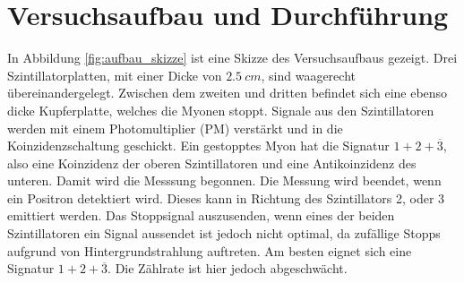 \documentclass[a4paper,ngerman]{scrartcl}
\begin{document}
\clearpage

\section{Versuchsaufbau und Durchführung}

In Abbildung \ref{fig:aufbau_skizze} ist eine Skizze des Versuchsaufbaus gezeigt. Drei Szintillatorplatten, mit einer Dicke von $\SI{2.5}{cm}$, sind waagerecht übereinandergelegt. Zwischen dem zweiten und dritten befindet sich eine ebenso dicke Kupferplatte, welches die Myonen stoppt. 
Signale aus den Szintillatoren werden mit einem Photomultiplier (PM) verstärkt und in die Koinzidenzschaltung geschickt.
Ein gestopptes Myon hat die Signatur $1 + 2 + \overline{3}$, also eine Koinzidenz der oberen Szintillatoren und eine Antikoinzidenz des unteren. Damit wird die Messsung begonnen. Die Messung wird beendet, wenn ein Positron detektiert wird. Dieses kann in Richtung des Szintillators 2, oder 3 emittiert werden. Das Stoppsignal auszusenden, wenn eines der beiden Szintillatoren ein Signal aussendet ist jedoch nicht optimal, da zufällige Stopps aufgrund von Hintergrundstrahlung auftreten. Am besten eignet sich eine Signatur $1 + 2 + \overline{3}$. Die Zählrate ist hier jedoch abgeschwächt.  
\end{document}
